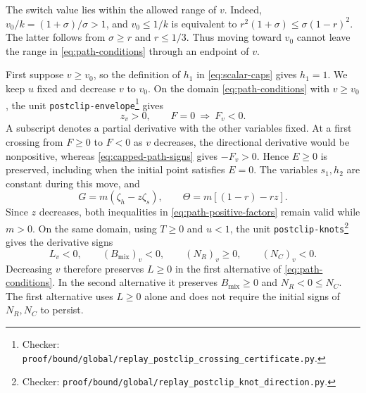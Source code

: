 \documentclass[11pt]{article}
\theoremstyle{remark}
\theoremstyle{plain}
\begin{document}
The switch value lies within the allowed range of $v$. Indeed,
$v_0/k=(1+\sigma)/\sigma>1$, and
$v_0\le1/k$ is equivalent to
$r^2(1+\sigma)\le\sigma(1-r)^2$.
The latter follows from $\sigma\ge r$ and $r\le1/3$.
Thus moving toward $v_0$ cannot leave the range in
\eqref{eq:path-conditions} through an endpoint of $v$.

First suppose $v\ge v_0$, so the definition of $h_1$ in
\eqref{eq:scalar-caps} gives $h_1=1$. We keep $u$ fixed and
decrease $v$ to $v_0$. On the domain \eqref{eq:path-conditions}
with $v\ge v_0$, the unit \nolinkurl{postclip-envelope}\footnote{Checker:
\nolinkurl{proof/bound/global/replay_postclip_crossing_certificate.py}.\label{fn:checker-postclip-envelope}} gives
\begin{equation}
 z_v>0,\qquad F=0\ \Longrightarrow\ F_v<0.
 \label{eq:capped-path-signs}
\end{equation}
A subscript denotes a partial derivative with the other variables
fixed. At a first crossing from $F\ge0$ to $F<0$ as $v$ decreases,
the directional derivative would be nonpositive, whereas
\eqref{eq:capped-path-signs} gives $-F_v>0$. Hence $E\ge0$ is
preserved, including when the initial point satisfies $E=0$.
The variables $s_1,h_2$ are constant during this move, and
\begin{equation}
 G=m(\zeta_h-z\zeta_s),\qquad
 \Theta=m[(1-r)-rz].
 \label{eq:path-positive-factors}
\end{equation}
Since $z$ decreases, both inequalities in
\eqref{eq:path-positive-factors} remain valid while $m>0$.
On the same domain, using $T\ge0$ and $u<1$, the unit
\nolinkurl{postclip-knots}\footnote{Checker:
\nolinkurl{proof/bound/global/replay_postclip_knot_direction.py}.\label{fn:checker-postclip-knots}} gives the derivative signs
\begin{equation}
 L_v<0,\qquad (B_{\mathrm{mix}})_v<0,\qquad
 (N_R)_v\ge0,\qquad (N_C)_v<0.
 \label{eq:capped-determinant-signs}
\end{equation}
Decreasing $v$ therefore preserves $L\ge0$ in the first alternative
of \eqref{eq:path-conditions}. In the second alternative it preserves
$B_{\mathrm{mix}}\ge0$ and $N_R<0\le N_C$.
The first alternative uses $L\ge0$ alone and does not require the
initial signs of $N_R,N_C$ to persist.
\end{document}
